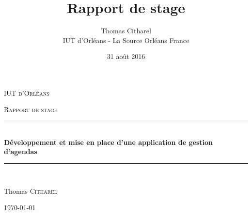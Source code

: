 \documentclass[10pt,a4paper, twoside]{report}
\author{Thomas Citharel\\
	IUT d'Orléans - La Source
	Orléans
	France}
\date{31 août 2016}
\title{Rapport de stage}
\newcommand{\HRule}{\rule{\linewidth}{0.5mm}}
\begin{document}
	\begin{titlepage}
		\center
		
		\textsc{\LARGE IUT d'Orléans}\\[1.5cm]
		{\scshape\Large Rapport de stage\par}
		\HRule \\[0.4cm]
		{ \huge \bfseries Développement et mise en place d'une application de gestion d'agendas}\\[0.4cm]
		\HRule \\[1.5cm]
		
		
		{\Large Thomas \scshape Citharel\par}
		{\large \today\par}
		
		\vspace{4cm}
		

\end{titlepage}
\end{document}
